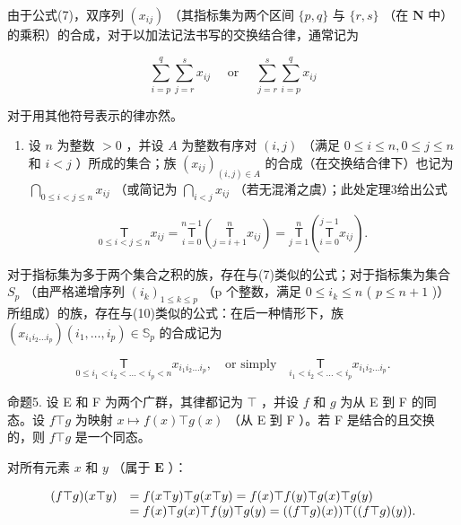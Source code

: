 由于公式(7)，双序列 \((x_{ij})\) （其指标集为两个区间 \(\{p, q\}\) 与 \(\{r, s\}\) （在 \(\mathbf{N}\) 中）的乘积）的合成，对于以加法记法书写的交换结合律，通常记为

\[
\sum_ {i = p} ^ {q} \sum_ {j = r} ^ {s} x _ {i j} \quad \text { or } \quad \sum_ {j = r} ^ {s} \sum_ {i = p} ^ {q} x _ {i j}
\]

对于用其他符号表示的律亦然。

\begin{enumerate}
\def\labelenumi{\arabic{enumi}.}
\setcounter{enumi}{1}
\tightlist
\item
  设 \(n\) 为整数 \(>0\) ，并设 \(A\) 为整数有序对 \((i,j)\) （满足 \(0 \leqslant i \leqslant n, 0 \leqslant j \leqslant n\) 和 \(i < j\) ）所成的集合；族 \((x_{ij})_{(i,j) \in A}\) 的合成（在交换结合律下）也记为 \(\bigcap_{0 \leqslant i < j \leqslant n} x_{ij}\) （或简记为 \(\bigcap_{i < j} x_{ij}\) （若无混淆之虞）；此处定理3给出公式
\end{enumerate}

\[
\underset {0 \leqslant i <   j \leqslant n} {\mathsf {T}} x _ {i j} = \underset {i = 0} {\overset {n - 1} {\mathsf {T}}} \left(\underset {j = i + 1} {\overset {n} {\mathsf {T}}} x _ {i j}\right) = \underset {j = 1} {\overset {n} {\mathsf {T}}} \left(\underset {i = 0} {\overset {j - 1} {\mathsf {T}}} x _ {i j}\right).\tag{10}
\]

对于指标集为多于两个集合之积的族，存在与(7)类似的公式；对于指标集为集合 \(S_{p}\) （由严格递增序列 \((i_{k})_{1\leqslant k\leqslant p}\) （p 个整数，满足 \(0\leqslant i_{k}\leqslant n\) ( \(p\leqslant n+1\) )）所组成）的族，存在与(10)类似的公式：在后一种情形下，族 \((x_{i_{1}i_{2}\ldots i_{p}})(i_{1},\ldots,i_{p})\in\mathbb{S}_{p}\) 的合成记为

\[
\underset {0 \leqslant i _ {1} <   i _ {2} <   \dots <   i _ {p} <   n} {\mathsf {T}} x _ {i _ {1} i _ {2} \ldots i _ {p}}, \quad \text {or simply} \quad \underset {i _ {1} <   i _ {2} <   \dots <   i _ {p}} {\mathsf {T}} x _ {i _ {1} i _ {2} \ldots i _ {p}}.
\]

命题5. 设 E 和 F 为两个广群，其律都记为 \(\top\) ，并设 \(f\) 和 \(g\) 为从 E 到 F 的同态。设 \(f \top g\) 为映射 \(x \mapsto f(x) \top g(x)\) （从 E 到 F ）。若 F 是结合的且交换的，则 \(f \top g\) 是一个同态。

对所有元素 \(x\) 和 \(y\) （属于 \(\mathbf{E}\) ）：

\[
\begin{array}{r l} (f \top g) (x \top y) & = f (x \top y) \top g (x \top y) = f (x) \top f (y) \top g (x) \top g (y) \\ & = f (x) \top g (x) \top f (y) \top g (y) = ((f \top g) (x)) \top ((f \top g) (y)). \end{array}
\]

